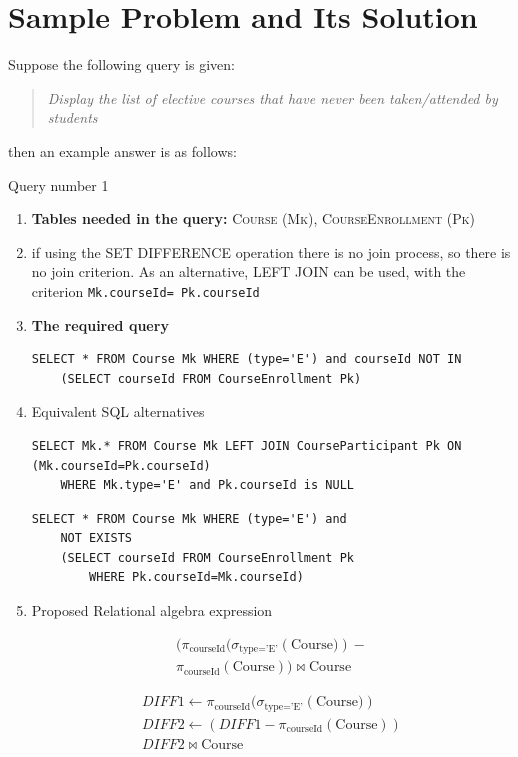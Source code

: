 \section{Sample Problem and Its Solution}
Suppose the following query is given:
\begin{tcolorbox}{}
\begin{quote}
    \textit{Display the list of elective courses that have never been taken/attended by students}
\end{quote}
\end{tcolorbox}
then an example answer is as follows:
\begin{infobox}{Query number 1}
    \begin{enumerate}
        \itemsep0em \small
         \item \textbf{Tables needed in the query:} \textsc{Course (Mk), CourseEnrollment (Pk)}
         \item if using the SET DIFFERENCE operation there is no join process, so there is no join criterion. As an alternative, LEFT JOIN can be used, with the criterion \texttt{Mk.courseId= Pk.courseId} %
         \item \textbf{The required query} 
         \begin{lstlisting}[caption= SET DIFFERENCE approach]
SELECT * FROM Course Mk WHERE (type='E') and courseId NOT IN 
    (SELECT courseId FROM CourseEnrollment Pk)       
         \end{lstlisting}
         \item Equivalent SQL alternatives
         \begin{lstlisting}[caption=Using LEFT JOIN]
SELECT Mk.* FROM Course Mk LEFT JOIN CourseParticipant Pk ON (Mk.courseId=Pk.courseId) 
    WHERE Mk.type='E' and Pk.courseId is NULL
         \end{lstlisting}
      \begin{lstlisting}[caption=Using EXISTS]
SELECT * FROM Course Mk WHERE (type='E') and 
    NOT EXISTS
    (SELECT courseId FROM CourseEnrollment Pk 
        WHERE Pk.courseId=Mk.courseId)       
         \end{lstlisting}  
 \item Proposed Relational algebra expression
 
 \[
\begin{array}{c}
(\pi_{\text{courseId}}(\sigma_{\text{type='E'}}\left(\text{Course}) \right) - \\ \pi_{\text{courseId}}\left(\text{Course}\right))   \bowtie \text{Course}
\end{array}
 \]


 \[
 \begin{array}{c}
DIFF1 \leftarrow \pi_{\text{courseId}}(\sigma_{\text{type='E'}}\left(\text{Course}) \right)\\
 DIFF2 \leftarrow (DIFF1 - \pi_{\text{courseId}}\left(\text{Course}\right))  \\
DIFF2 \bowtie \text{Course}
 \end{array}
 \]
 
    \end{enumerate}
\end{infobox}